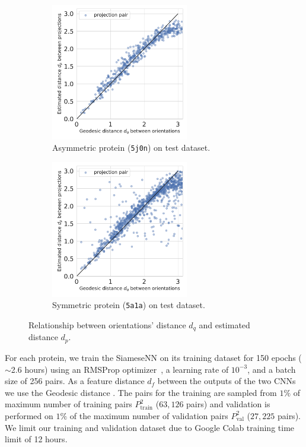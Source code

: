 \begin{figure}
    \centering
    \begin{subfigure}[b]{0.5\columnwidth}
        \includegraphics[height=6cm]{figures/dPdQ_5j0n}
        \caption{Asymmetric protein (\texttt{5j0n}) on test dataset.}
    \end{subfigure}
    \begin{subfigure}[b]{0.45\columnwidth}
    \centering
        \includegraphics[height=6cm]{figures/dPdQ_5a1a}
        \caption{Symmetric protein (\texttt{5a1a}) on test dataset.}
    \end{subfigure}
    \caption{Relationship between orientations' distance $d_q$ and estimated distance $d_p$.}
    \label{fig:learned-distance-siamese}
\end{figure}

For each protein, we train the SiameseNN on its training dataset for 150 epochs ($\sim$2.6 hours) using an RMSProp optimizer~\cite{tieleman2012rmsprop}, a learning rate of $10^{-3}$, and a batch size of 256 pairs. As a feature distance $d_f$ between the outputs of the two CNNs we use the Geodesic distance .
The pairs for the training are sampled from $1\%$ of maximum number of training pairs $P_{\text{train}}^2$ ($63,126$ pairs) and validation is performed on $1\%$ of the maximum number of validation pairs $P_{\text{val}}^2$ ($27,225$ pairs). We limit our training and validation dataset due to Google Colab training time limit of 12 hours.


